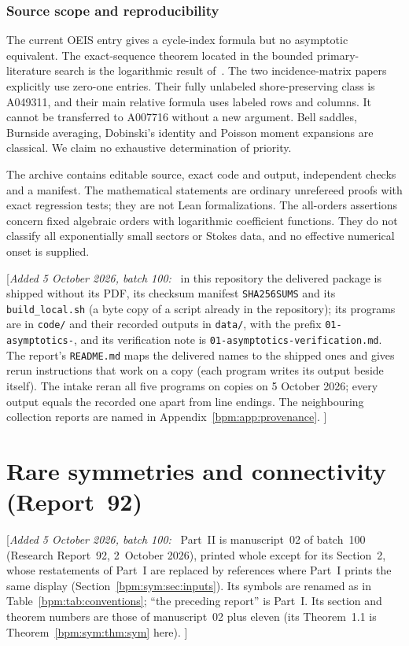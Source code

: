 \documentclass[11pt,a4paper]{article}
\theoremstyle{remark}\newtheorem{remark}[theorem]{Remark}%
\newenvironment{writenote}{\par\smallskip\noindent\small[\textit{Added 5 October 2026, batch 100:}\ }{]\par\smallskip}
\begin{document}
\section{Source scope and reproducibility}\label{bpm:sec:scope}
The current OEIS entry gives a cycle-index formula but no asymptotic equivalent. The exact-sequence theorem located in the bounded primary-literature search is the logarithmic result of~\cite{PML}. The two incidence-matrix papers~\cite{CPS,CPS2} explicitly use zero-one entries. Their fully unlabeled shore-preserving class is A049311, and their main relative formula uses labeled rows and columns. It cannot be transferred to A007716 without a new argument. Bell saddles, Burnside averaging, Dobinski's identity and Poisson moment expansions are classical. We claim no exhaustive determination of priority.

The archive contains editable source, exact code and output, independent checks and a manifest. The mathematical statements are ordinary unrefereed proofs with exact regression tests; they are not Lean formalizations. The all-orders assertions concern fixed algebraic orders with logarithmic coefficient functions. They do not classify all exponentially small sectors or Stokes data, and no effective numerical onset is supplied.

\begin{writenote}
in this repository the delivered package is shipped without its PDF, its
checksum manifest \texttt{SHA256SUMS} and its \nolinkurl{build_local.sh} (a
byte copy of a script already in the repository); its programs are in
\nolinkurl{code/} and their recorded outputs in \nolinkurl{data/}, with the prefix
\texttt{01-asymptotics-}, and its verification note is
\nolinkurl{01-asymptotics-verification.md}. The report's \nolinkurl{README.md}
maps the delivered names to the shipped ones and gives rerun instructions
that work on a copy (each program writes its output beside itself). The
intake reran all five programs on copies on 5 October 2026; every output
equals the recorded one apart from line endings. The neighbouring
collection reports are named in Appendix~\ref{bpm:app:provenance}.
\end{writenote}

\part{Rare symmetries and connectivity (Report~92)}\label{bpm:sym:part}

\begin{writenote}
Part~II is manuscript~02 of batch~100 (Research Report~92, 2~October
2026), printed whole except for its Section~2, whose restatements of
Part~I are replaced by references where Part~I prints the same display
(Section~\ref{bpm:sym:sec:inputs}). Its symbols are renamed as in
Table~\ref{bpm:tab:conventions}; ``the preceding report'' is Part~I. Its
section and theorem numbers are those of manuscript~02 plus eleven (its
Theorem~1.1 is Theorem~\ref{bpm:sym:thm:sym} here).
\end{writenote}
\end{document}
